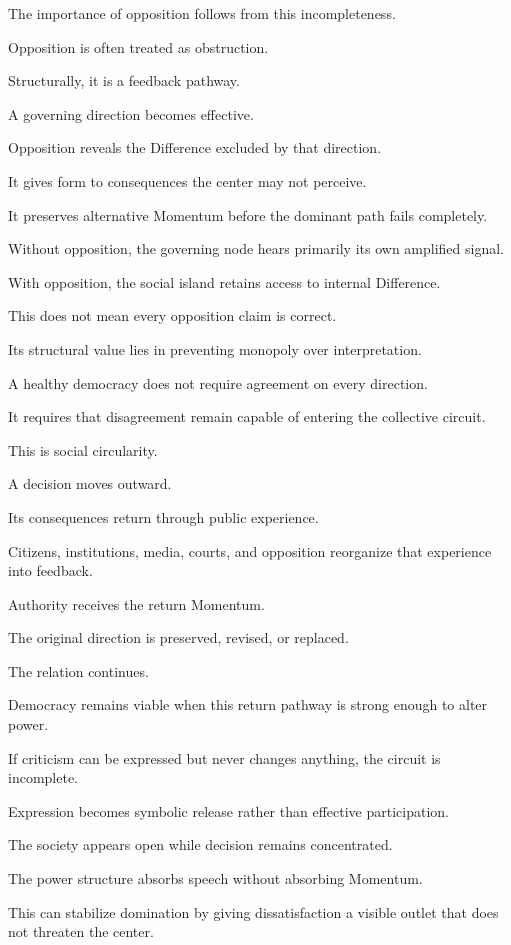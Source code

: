 The importance of opposition follows from this incompleteness.

Opposition is often treated as obstruction.

Structurally, it is a feedback pathway.

A governing direction becomes effective.

Opposition reveals the Difference excluded by that direction.

It gives form to consequences the center may not perceive.

It preserves alternative Momentum before the dominant path fails completely.

Without opposition, the governing node hears primarily its own amplified signal.

With opposition, the social island retains access to internal Difference.

This does not mean every opposition claim is correct.

Its structural value lies in preventing monopoly over interpretation.

A healthy democracy does not require agreement on every direction.

It requires that disagreement remain capable of entering the collective circuit.

This is social circularity.

A decision moves outward.

Its consequences return through public experience.

Citizens, institutions, media, courts, and opposition reorganize that experience into feedback.

Authority receives the return Momentum.

The original direction is preserved, revised, or replaced.

The relation continues.

Democracy remains viable when this return pathway is strong enough to alter power.

If criticism can be expressed but never changes anything, the circuit is incomplete.

Expression becomes symbolic release rather than effective participation.

The society appears open while decision remains concentrated.

The power structure absorbs speech without absorbing Momentum.

This can stabilize domination by giving dissatisfaction a visible outlet that does not threaten the center.


